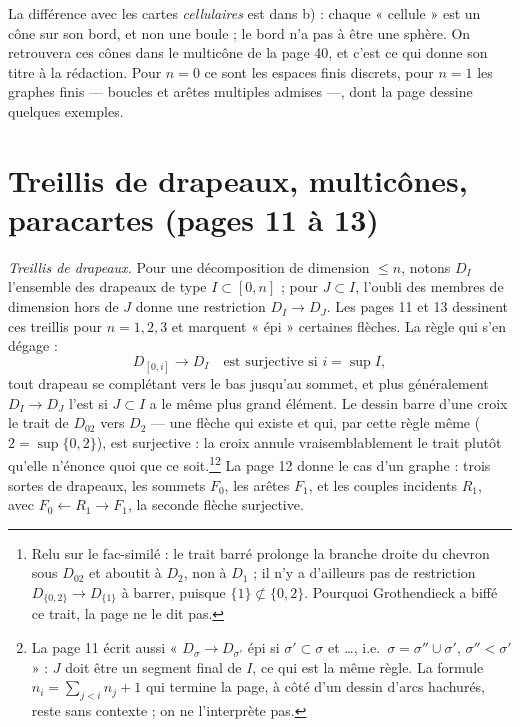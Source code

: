 \documentclass[11pt,a4paper]{article}
\begin{document}
La différence avec les cartes \emph{cellulaires} est dans b) : chaque
« cellule » est un cône sur son bord, et non une boule ; le bord n'a pas à
être une sphère. On retrouvera ces cônes dans le multicône de la page 40, et
c'est ce qui donne son titre à la rédaction. Pour $n = 0$ ce sont les espaces
finis discrets, pour $n = 1$ les graphes finis --- boucles et arêtes
multiples admises ---, dont la page dessine quelques exemples.

\section*{Treillis de drapeaux, multicônes, paracartes (pages 11 à 13)}

\emph{Treillis de drapeaux.} Pour une décomposition de dimension $\leqslant
n$, notons $D_I$ l'ensemble des drapeaux de type $I \subset [0, n]$ ; pour $J
\subset I$, l'oubli des membres de dimension hors de $J$ donne une
restriction $D_I \to D_J$. Les pages 11 et 13 dessinent ces treillis pour $n
= 1, 2, 3$ et marquent « épi » certaines flèches. La règle qui s'en dégage :
\[
  D_{[0,i]} \longrightarrow D_I \quad \text{est surjective si } i = \sup I ,
\]
tout drapeau se complétant vers le bas jusqu'au sommet, et plus généralement
$D_I \to D_J$ l'est si $J \subset I$ a le même plus grand élément. Le dessin
barre d'une croix le trait de $D_{02}$ vers $D_2$ --- une flèche qui existe
et qui, par cette règle même ($2 = \sup \{0,2\}$), est surjective : la
croix annule vraisemblablement le trait plutôt qu'elle n'énonce quoi que ce
soit.\footnote{Relu sur le fac-similé : le trait barré prolonge la branche
droite du chevron sous $D_{02}$ et aboutit à $D_2$, non à $D_1$ ; il n'y a
d'ailleurs pas de restriction $D_{\{0,2\}} \to D_{\{1\}}$ à barrer, puisque
$\{1\} \not\subset \{0,2\}$. Pourquoi Grothendieck a biffé ce trait, la page
ne le dit pas.}\footnote{La page 11 écrit
aussi « $D_\sigma \to D_{\sigma'}$ épi si $\sigma' \subset \sigma$ et
\ldots, i.e.\ $\sigma = \sigma'' \cup \sigma'$, $\sigma'' < \sigma'$ » : $J$ doit
être un segment final de $I$, ce qui est la même règle. La formule $n_i =
\sum_{j<i} n_j + 1$ qui termine la page, à côté d'un dessin d'arcs hachurés,
reste sans contexte ; on ne l'interprète pas.} La page 12 donne le cas d'un
graphe : trois sortes de drapeaux, les sommets $F_0$, les arêtes $F_1$, et les
couples incidents $R_1$, avec $F_0 \leftarrow R_1 \to F_1$, la seconde flèche
surjective.
\end{document}

